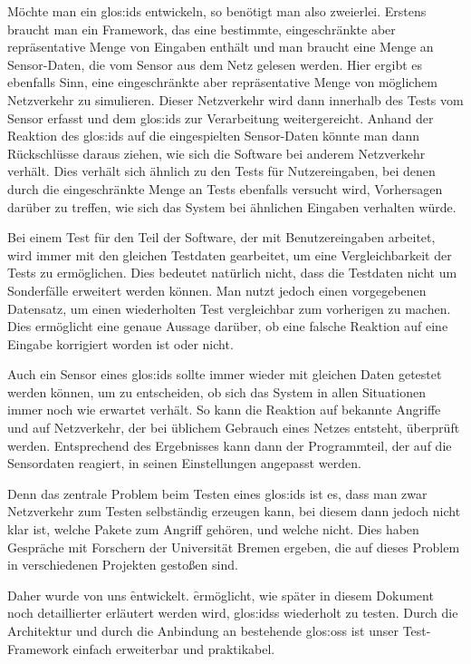 Möchte man ein \gls{glos:ids} entwickeln, so benötigt man also
zweierlei. Erstens braucht man ein Framework, das eine bestimmte,
eingeschränkte aber repräsentative Menge von Eingaben enthält und man
braucht eine Menge an Sensor-Daten, die vom Sensor aus dem Netz
gelesen werden. Hier ergibt es ebenfalls Sinn, eine eingeschränkte
aber repräsentative Menge von möglichem Netzverkehr zu
simulieren. Dieser Netzverkehr wird dann innerhalb des Tests vom
Sensor erfasst und dem \gls{glos:ids} zur Verarbeitung
weitergereicht. Anhand der Reaktion des \gls{glos:ids} auf die
eingespielten Sensor-Daten könnte man dann Rückschlüsse daraus ziehen,
wie sich die Software bei anderem Netzverkehr verhält. Dies verhält
sich ähnlich zu den Tests für Nutzereingaben, bei denen durch die
eingeschränkte Menge an Tests ebenfalls versucht wird, Vorhersagen
darüber zu treffen, wie sich das System bei ähnlichen Eingaben
verhalten würde.

Bei einem Test für den Teil der Software, der mit Benutzereingaben arbeitet,
wird immer mit den gleichen Testdaten gearbeitet, um eine
Vergleichbarkeit der Tests zu ermöglichen. Dies bedeutet natürlich
nicht, dass die Testdaten nicht um Sonderfälle erweitert werden
können. Man nutzt jedoch einen vorgegebenen Datensatz, um einen
wiederholten Test vergleichbar zum vorherigen zu machen. Dies
ermöglicht eine genaue Aussage darüber, ob eine falsche Reaktion auf
eine Eingabe korrigiert worden ist oder nicht. 

Auch ein Sensor eines \gls{glos:ids} sollte immer wieder mit gleichen
Daten getestet werden können, um zu entscheiden, ob sich das System in
allen Situationen immer noch wie erwartet verhält. So kann die
Reaktion auf bekannte Angriffe und auf Netzverkehr, der bei üblichem
Gebrauch eines Netzes entsteht, überprüft werden. Entsprechend des
Ergebnisses kann dann der Programmteil, der auf die Sensordaten
reagiert, in seinen Einstellungen angepasst werden.

Denn das zentrale Problem beim Testen eines \gls{glos:ids} ist es,
dass man zwar Netzverkehr zum Testen selbständig erzeugen kann, bei
diesem dann jedoch nicht klar ist, welche Pakete zum Angriff gehören,
und welche nicht. Dies haben Gespräche mit Forschern der Universität
Bremen ergeben, die auf dieses Problem in verschiedenen Projekten
gestoßen sind. 

Daher wurde von uns \f entwickelt. \f ermöglicht, wie später in diesem
Dokument noch detaillierter erläutert werden wird, \glspl{glos:ids}
wiederholt zu testen. Durch die Architektur und durch die Anbindung an
bestehende \gls{glos:oss} ist unser Test-Framework einfach erweiterbar
und praktikabel.
